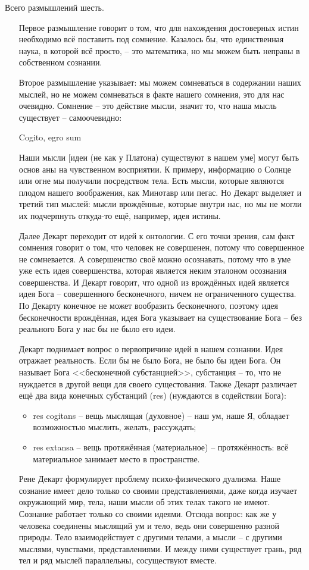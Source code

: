 \documentclass[a4paper, 12pt]{book} %
\begin{document}
Всего размышлений шесть.
\begin{itemize}
\item[Первое размышление] говорит о том, что для нахождения достоверных истин необходимо всё поставить под сомнение. Казалось бы, что единственная наука, в которой всё просто, -- это математика, но мы можем быть неправы в собственном сознании.
\item[Второе размышление] указывает: мы можем сомневаться в содержании наших мыслей, но не можем сомневаться в факте нашего сомнения, это для нас очевидно. Сомнение -- это действие мысли, значит то, что наша мысль существует -- самоочевидно:
\begin{center}
Cogito, egro sum
\end{center}
Наши мысли [идеи (не как у Платона) существуют в нашем уме] могут быть основ	аны на чувственном восприятии. К примеру, информацию о Солнце или огне мы получили посредством тела. Есть мысли, которые являются плодом нашего воображения, как Минотавр или пегас. Но Декарт выделяет и третий тип мыслей: мысли врождённые, которые внутри нас, но мы не могли их подчерпнуть откуда-то ещё, например, идея истины. 

Далее Декарт переходит от идей к онтологии. С его точки зрения, сам факт сомнения говорит о том, что человек не совершенен, потому что совершенное не сомневается. А совершенство своё можно осознавать, потому что в уме уже есть идея совершенства, которая является неким эталоном осознания совершенства. И Декарт говорит, что одной из врождённых идей является идея Бога -- совершенного бесконечного, ничем не ограниченного существа. По Декарту конечное не может вообразить бесконечного, поэтому идея бесконечности врождённая, идея Бога указывает на существование Бога -- без реального Бога у нас бы не было его идеи.

Декарт поднимает вопрос о первопричине идей в нашем сознании. Идея отражает реальность. Если бы не было Бога, не было бы идеи Бога. Он называет Бога <<бесконечной субстанцией>>, субстанция -- то, что не нуждается в другой вещи для своего сущестования. Также Декарт различает ещё два вида конечных субстанций (res) (нуждаются в содействии Бога):

\begin{itemize}
\item res cogitans -- вещь мыслящая (духовное) -- наш ум, наше Я, обладает возможностью мыслить, желать, рассуждать;
\item res extansa -- вещь протяжённая (материальное) -- протяжённость: всё материальное занимает место в пространстве.
\end{itemize} 

Рене Декарт формулирует проблему психо-физического дуализма. Наше сознание имеет дело только со своими представлениями, даже когда изучает окружающий мир, тела, наши мысли об этих телах такого не имеют. Сознание работает только со своими идеями. Отсюда вопрос: как же у человека соединены мыслящий ум и тело, ведь они совершенно разной природы. Тело взаимодействует с другими телами, а мысли -- с другими мыслями, чувствами, представлениями. И между ними существует грань, ряд тел и ряд мыслей параллельны, сосуществуют вместе.
\end{itemize}
\end{document}
